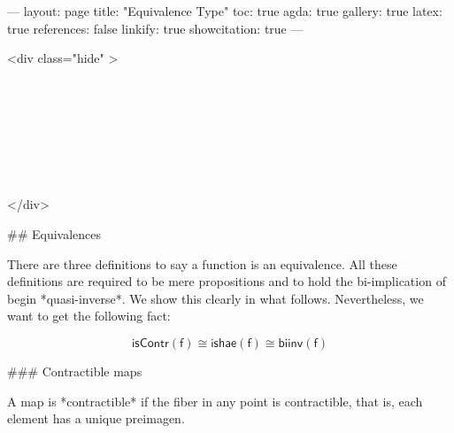 ---
layout: page
title: "Equivalence Type"
toc: true
agda: true
gallery: true
latex: true
references: false
linkify: true
showcitation: true
---

<div class="hide" >
\begin{code}%
\>[0]\AgdaSymbol{\{-\#}\AgdaSpace{}%
\AgdaSpace{}%
\AgdaSpace{}%
\AgdaSymbol{\#-\}}\<%
\\
\>[0]\AgdaSpace{}%
\AgdaSpace{}%
\<%
\\
\>[0]\AgdaSpace{}%
\AgdaSpace{}%
\<%
\\
\>[0]\AgdaSpace{}%
\AgdaSpace{}%
\<%
\\
%
\\[\AgdaEmptyExtraSkip]%
\>[0]\AgdaSpace{}%
\AgdaSpace{}%
\<%
\\
\>[0]\AgdaSpace{}%
\AgdaSpace{}%
\<%
\end{code}
</div>

## Equivalences

\begin{code}%
\>[0]\AgdaSpace{}%
\AgdaSpace{}%
\<%
\end{code}

There are three definitions to say a function is an
equivalence. All these definitions
are required to be mere propositions and to hold
the bi-implication of begin *quasi-inverse*. We show
this clearly in what follows. Nevertheless, we want to get
the following fact:

$$ \mathsf{isContr(f)} \cong \mathsf{ishae(f)} \cong \mathsf{biinv(f)} $$

### Contractible maps

A map is *contractible* if the fiber in any point is contractible, that is, each
element has a unique preimagen.

